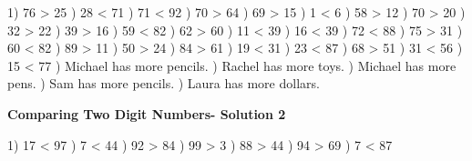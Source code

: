 \documentclass{article}%
\begin{document}
1) 76 > 25%
) 28 < 71%
) 71 < 92%
) 70 > 64%
) 69 > 15%
) 1 < 6%
) 58 > 12%
) 70 > 20%
) 32 > 22%
) 39 > 16%
) 59 < 82%
) 62 > 60%
) 11 < 39%
) 16 < 39%
) 72 < 88%
) 75 > 31%
) 60 < 82%
) 89 > 11%
) 50 > 24%
) 84 > 61%
) 19 < 31%
) 23 < 87%
) 68 > 51%
) 31 < 56%
) 15 < 77%
) Michael has more pencils.%
) Rachel has more toys.%
) Michael has more pens.%
) Sam has more pencils.%
) Laura has more dollars.%
\newline%
\newpage%
\large%
\begin{center}%
\textbf{Comparing Two Digit Numbers- Solution 2}%
\newline%
\end{center} \normalsize%
1) 17 < 97%
) 7 < 44%
) 92 > 84%
) 99 > 3%
) 88 > 44%
) 94 > 69%
) 7 < 87%
\newline%
\end{document}

